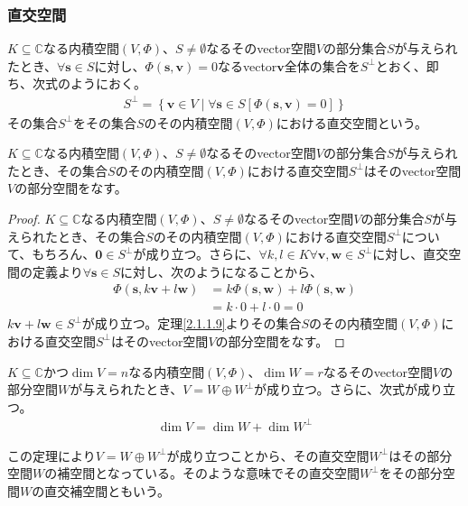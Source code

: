 \documentclass[dvipdfmx]{jsarticle}
\begin{document}
\subsubsection{直交空間}%
\begin{dfn}
$K \subseteq \mathbb{C}$なる内積空間$(V,\varPhi )$、$S \neq \emptyset$なるそのvector空間$V$の部分集合$S$が与えられたとき、$\forall\mathbf{s} \in S$に対し、$\varPhi \left( \mathbf{s},\mathbf{v} \right) = 0$なるvector$\mathbf{v}$全体の集合を$S^{\bot}$とおく、即ち、次式のようにおく。
\begin{align*}
S^{\bot} = \left\{ \mathbf{v} \in V \middle| \forall\mathbf{s} \in S\left[ \varPhi \left( \mathbf{s},\mathbf{v} \right) = 0 \right] \right\}
\end{align*}
その集合$S^{\bot}$をその集合$S$のその内積空間$(V,\varPhi )$における直交空間という。
\end{dfn}
\begin{thm}\label{2.3.7.9}
$K \subseteq \mathbb{C}$なる内積空間$(V,\varPhi )$、$S \neq \emptyset$なるそのvector空間$V$の部分集合$S$が与えられたとき、その集合$S$のその内積空間$(V,\varPhi )$における直交空間$S^{\bot}$はそのvector空間$V$の部分空間をなす。
\end{thm}
\begin{proof}
$K \subseteq \mathbb{C}$なる内積空間$(V,\varPhi )$、$S \neq \emptyset$なるそのvector空間$V$の部分集合$S$が与えられたとき、その集合$S$のその内積空間$(V,\varPhi )$における直交空間$S^{\bot}$について、もちろん、$\mathbf{0} \in S^{\bot}$が成り立つ。さらに、$\forall k,l \in K\forall\mathbf{v},\mathbf{w} \in S^{\bot}$に対し、直交空間の定義より$\forall\mathbf{s} \in S$に対し、次のようになることから、
\begin{align*}
\varPhi \left( \mathbf{s},k\mathbf{v} + l\mathbf{w} \right) &= k\varPhi \left( \mathbf{s},\mathbf{w} \right) + l\varPhi \left( \mathbf{s},\mathbf{w} \right)\\
&= k \cdot 0 + l \cdot 0 = 0
\end{align*}
$k\mathbf{v} + l\mathbf{w} \in S^{\bot}$が成り立つ。定理\ref{2.1.1.9}よりその集合$S$のその内積空間$(V,\varPhi )$における直交空間$S^{\bot}$はそのvector空間$V$の部分空間をなす。
\end{proof}
\begin{thm}\label{2.3.7.10}
$K \subseteq \mathbb{C}$かつ$\dim V = n$なる内積空間$(V,\varPhi )$、$\dim W = r$なるそのvector空間$V$の部分空間$W$が与えられたとき、$V = W \oplus W^{\bot}$が成り立つ。さらに、次式が成り立つ。
\begin{align*}
\dim V = \dim W + \dim W^{\bot}
\end{align*}\par
この定理により$V = W \oplus W^{\bot}$が成り立つことから、その直交空間$W^{\bot}$はその部分空間$W$の補空間となっている。そのような意味でその直交空間$W^{\bot}$をその部分空間$W$の直交補空間ともいう。
\end{thm}
\end{document}
